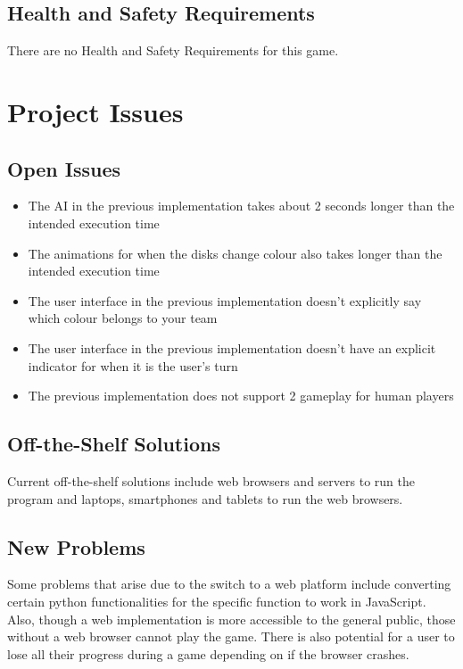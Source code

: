 \documentclass[12pt, titlepage]{article}
\begin{document}
\subsection{Health and Safety Requirements}
There are no Health and Safety Requirements for this game.

\section{Project Issues}

\subsection{Open Issues}
\begin{itemize}
	\item The AI in the previous implementation takes about 2 seconds longer than the intended execution time
	\item The animations for when the disks change colour also takes longer than the intended execution time
	\item The user interface in the previous implementation doesn’t explicitly say which colour belongs to your team
	\item The user interface in the previous implementation doesn’t have an explicit indicator for when it is the user’s turn
	\item The previous implementation does not support 2 gameplay for human players
\end{itemize}

\subsection{Off-the-Shelf Solutions}

Current off-the-shelf solutions include web browsers and servers to run the program and laptops, smartphones and tablets to run the web browsers.

\subsection{New Problems}

Some problems that arise due to the switch to a web platform include converting certain python functionalities for the specific function to work in JavaScript. Also, though a web implementation is more accessible to the general public, those without a web browser cannot play the game. There is also potential for a user to lose all their progress during a game depending on if the browser crashes.
\end{document}
